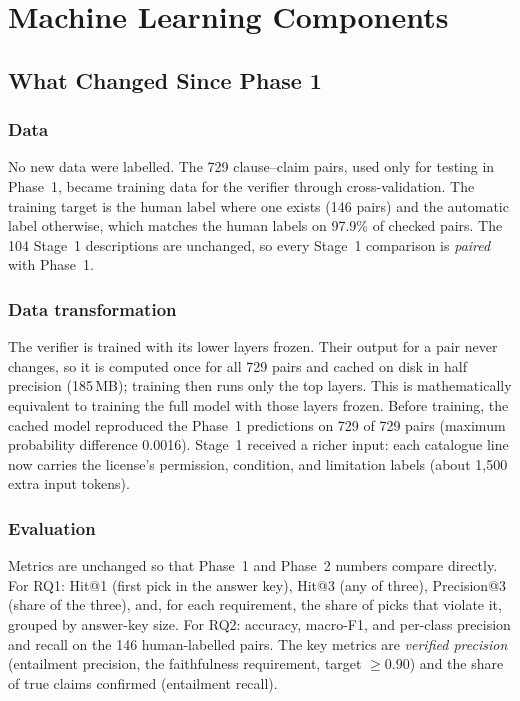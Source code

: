 \section{Machine Learning Components}
\label{s:ml}

\subsection{What Changed Since Phase 1}
\label{ss:mlchanges}

\subsubsection{Data}
No new data were labelled. The 729 clause--claim pairs, used only for testing in Phase~1, became training data for the verifier through cross-validation. The training target is the human label where one exists (146 pairs) and the automatic label otherwise, which matches the human labels on 97.9\% of checked pairs. The 104 Stage~1 descriptions are unchanged, so every Stage~1 comparison is \emph{paired} with Phase~1.

\subsubsection{Data transformation}
The verifier is trained with its lower layers frozen. Their output for a pair never changes, so it is computed once for all 729 pairs and cached on disk in half precision (185\,MB); training then runs only the top layers. This is mathematically equivalent to training the full model with those layers frozen. Before training, the cached model reproduced the Phase~1 predictions on 729 of 729 pairs (maximum probability difference 0.0016). Stage~1 received a richer input: each catalogue line now carries the license's permission, condition, and limitation labels (about 1{,}500 extra input tokens).

\subsubsection{Evaluation}
Metrics are unchanged so that Phase~1 and Phase~2 numbers compare directly. For RQ1: Hit@1 (first pick in the answer key), Hit@3 (any of three), Precision@3 (share of the three), and, for each requirement, the share of picks that violate it, grouped by answer-key size. For RQ2: accuracy, macro-F1, and per-class precision and recall on the 146 human-labelled pairs. The key metrics are \emph{verified precision} (entailment precision, the faithfulness requirement, target $\geq 0.90$) and the share of true claims confirmed (entailment recall).

